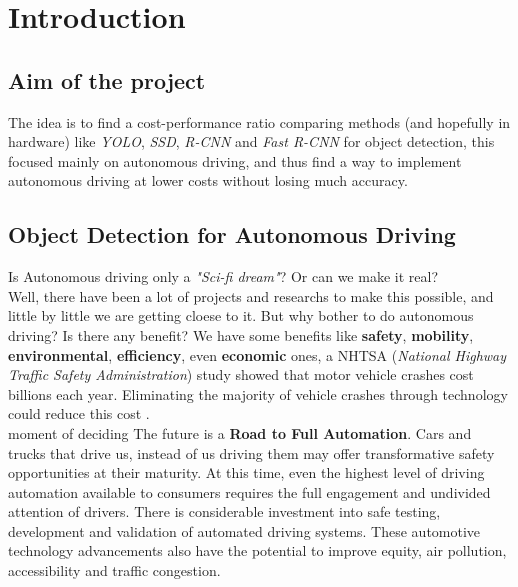 \section{Introduction}
\label{section: introduction}

\subsection{Aim of the project}
The idea is to find a cost-performance ratio comparing methods (and hopefully in
hardware) like \textit{YOLO}, \textit{SSD}, \textit{R-CNN} and
\textit{Fast R-CNN} for object detection, this focused mainly on autonomous
driving, and thus find a way to implement autonomous driving at lower costs
without losing much accuracy.

\subsection{Object Detection for Autonomous Driving}
Is Autonomous driving only a \textit{"Sci-fi dream"}? Or can we make it real?\\

Well, there have been a lot of projects and researchs to make this possible, and
little by little we are getting cloese to it. But why bother to do autonomous
driving? Is there any benefit? We have some benefits like \textbf{safety},
\textbf{mobility}, \textbf{environmental}, \textbf{efficiency}, even
\textbf{economic} ones, a NHTSA
(\textit{National Highway Traffic Safety Administration}) study showed that
motor vehicle crashes cost billions each year. Eliminating the majority of
vehicle crashes through technology could reduce this cost \cite{nhtsa}.\\
moment of deciding
The future is a \textbf{Road to Full Automation}. Cars and trucks that drive us,
instead of us driving them may offer transformative safety opportunities at
their maturity. At this time, even the highest level of driving automation
available to consumers requires the full engagement and undivided attention of
drivers. There is considerable investment into safe testing, development and
validation of automated driving systems. These automotive technology
advancements also have the potential to improve equity, air pollution,
accessibility and traffic congestion. \\

